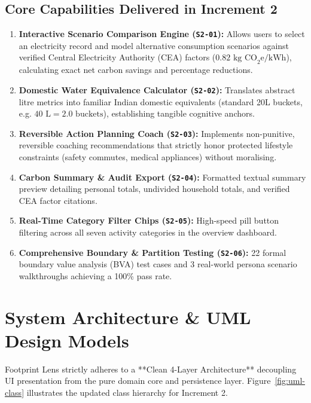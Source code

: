 \documentclass[12pt,a4paper]{article}
\begin{document}
\subsection{Core Capabilities Delivered in Increment 2}
\begin{enumerate}[leftmargin=*,itemsep=1pt]
    \item \textbf{Interactive Scenario Comparison Engine (\texttt{S2-01}):} Allows users to select an electricity record and model alternative consumption scenarios against verified Central Electricity Authority (CEA) factors ($0.82\text{ kg CO}_2\text{e/kWh}$), calculating exact net carbon savings and percentage reductions.
    \item \textbf{Domestic Water Equivalence Calculator (\texttt{S2-02}):} Translates abstract litre metrics into familiar Indian domestic equivalents (standard 20L buckets, e.g. $40\text{ L} = 2.0\text{ buckets}$), establishing tangible cognitive anchors.
    \item \textbf{Reversible Action Planning Coach (\texttt{S2-03}):} Implements non-punitive, reversible coaching recommendations that strictly honor protected lifestyle constraints (safety commutes, medical appliances) without moralising.
    \item \textbf{Carbon Summary \& Audit Export (\texttt{S2-04}):} Formatted textual summary preview detailing personal totals, undivided household totals, and verified CEA factor citations.
    \item \textbf{Real-Time Category Filter Chips (\texttt{S2-05}):} High-speed pill button filtering across all seven activity categories in the overview dashboard.
    \item \textbf{Comprehensive Boundary \& Partition Testing (\texttt{S2-06}):} 22 formal boundary value analysis (BVA) test cases and 3 real-world persona scenario walkthroughs achieving a 100\% pass rate.
\end{enumerate}

\section{System Architecture \& UML Design Models}

Footprint Lens strictly adheres to a **Clean 4-Layer Architecture** decoupling UI presentation from the pure domain core and persistence layer. Figure~\ref{fig:uml-class} illustrates the updated class hierarchy for Increment 2.
\end{document}
